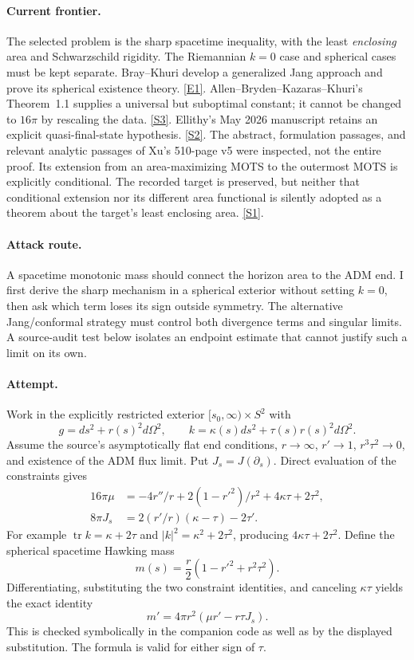 \documentclass[11pt,a4paper]{article}
\newcommand{\sref}[2]{\hyperlink{source:#1:#2}{[S#2]}}
\newcommand{\eref}[2]{\hyperlink{extra:#1:#2}{[E#2]}}
\numberwithin{equation}{section}
\begin{document}
\paragraph{Current frontier.}
The selected problem is the sharp spacetime inequality, with the least
\emph{enclosing} area and Schwarzschild rigidity. The Riemannian $k=0$ case
and spherical cases must be kept separate. Bray--Khuri develop a generalized
Jang approach and prove its spherical existence theory. \eref{statement}{1}.
Allen--Bryden--Kazaras--Khuri's Theorem~1.1 supplies a universal but suboptimal
constant; it cannot be changed to $16\pi$ by rescaling the data.
\sref{statement}{3}. Ellithy's May 2026 manuscript retains an explicit quasi-final-state
hypothesis. \sref{statement}{2}. The abstract, formulation passages, and relevant
analytic passages of Xu's 510-page v5 were inspected, not the entire proof.
Its extension from an area-maximizing MOTS to the outermost MOTS is explicitly
conditional. The recorded target is preserved, but neither that conditional
extension nor its different area functional is silently adopted as a theorem
about the target's least enclosing area. \sref{statement}{1}.

\paragraph{Attack route.}
A spacetime monotonic mass should connect the horizon area to the ADM end.
I first derive the sharp mechanism in a spherical exterior without setting
$k=0$, then ask which term loses its sign outside symmetry. The alternative
Jang/conformal strategy must control both divergence terms and singular
limits. A source-audit test below isolates an endpoint estimate that cannot
justify such a limit on its own.

\paragraph{Attempt.}
Work in the explicitly restricted exterior $[s_0,\infty)\times S^2$ with
\[
 g=ds^2+r(s)^2d\Omega^2,\qquad
 k=\kappa(s)ds^2+\tau(s)r(s)^2d\Omega^2.
\]
Assume the source's asymptotically flat end conditions, $r\to\infty$,
$r'\to1$, $r^3\tau^2\to0$, and existence of the ADM flux limit. Put
$J_s=J(\partial_s)$. Direct evaluation of the constraints gives
\begin{align*}
16\pi\mu&=-4r''/r+2(1-r'^2)/r^2+4\kappa\tau+2\tau^2,\\
8\pi J_s&=2(r'/r)(\kappa-\tau)-2\tau'.
\end{align*}
For example $\operatorname{tr}k=\kappa+2\tau$ and
$|k|^2=\kappa^2+2\tau^2$, producing $4\kappa\tau+2\tau^2$.
Define the spherical spacetime Hawking mass
\[
 m(s)=\frac r2(1-r'^2+r^2\tau^2).
\]
Differentiating, substituting the two constraint identities, and canceling
$\kappa\tau$ yields the exact identity
\begin{equation}\label{r37:identity}
 m'=4\pi r^2(\mu r'-r\tau J_s).
\end{equation}
This is checked symbolically in the companion code as well as by the displayed
substitution. The formula is valid for either sign of $\tau$.
\end{document}
